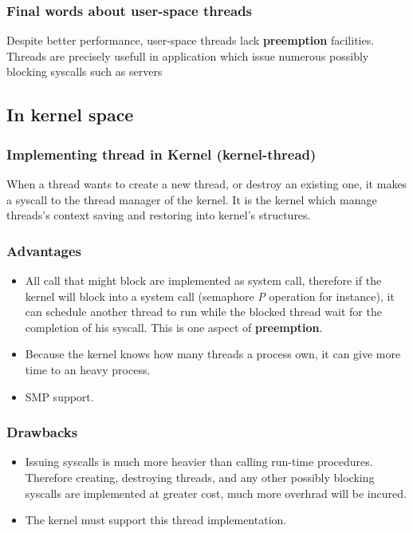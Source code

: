 
\begin{frame}
  \frametitle{Final words about user-space threads}

Despite better performance, user-space threads lack \textbf{preemption} facilities. Threads are precisely usefull in application which issue numerous possibly blocking syscalls such as servers \etc{}

\end{frame}


\subsection{In kernel space}


\begin{frame}
  \frametitle{Implementing thread in Kernel (kernel-thread)}

When a thread wants to create a new thread, or destroy an existing one, it makes a syscall to the thread manager of the kernel. It is the kernel which manage threads's context saving and restoring into kernel's structures.
\end{frame}


\begin{frame}
  \frametitle{Advantages}

\begin{itemize}
\item
All call that might block are implemented as system call, therefore if the kernel will block into a system call (semaphore \textit{P} operation for instance), it can schedule another thread to run while the blocked thread wait for the completion of his syscall. This is one aspect of \textbf{preemption}.
\item
Because the kernel knows how many threads a process own, it can give more time to an heavy process.
\item
SMP support.
\end{itemize}

\end{frame}


\begin{frame}
  \frametitle{Drawbacks}

\begin{itemize}
\item
Issuing syscalls is much more heavier than calling run-time procedures. Therefore creating, destroying threads, and any other possibly blocking syscalls are implemented at greater cost, much more overhrad will be incured.
\item
The kernel must support this thread implementation.
\end{itemize}

\end{frame}


